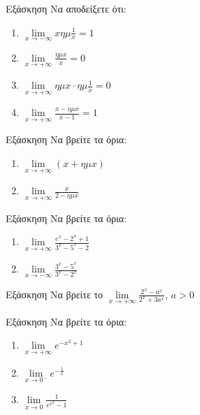 \documentclass[greek]{beamer}
\begin{document}
\begin{frame}{Εξάσκηση}
      Να αποδείξετε ότι:
      \begin{enumerate}
            \item $\lim\limits_{x \to -\infty}{ xημ\frac{1}{x} }=1$ \pause
            \item $\lim\limits_{x \to +\infty}{ \frac{ημx}{x}  }=0$  \pause
            \item $\lim\limits_{x \to +\infty}{ ημx\cdot ημ\frac{1}{x}  }=0$  \pause
            \item $\lim\limits_{x \to +\infty}{ \frac{x-ημx}{x-1}  }=1$
      \end{enumerate}
\end{frame}

\begin{frame}{Εξάσκηση}
      Να βρείτε τα όρια:
      \begin{enumerate}
            \item $\lim\limits_{x \to +\infty}{ (x+ημx) }$ \pause
            \item $\lim\limits_{x \to +\infty}{ \frac{x}{2-ημx}  }$
      \end{enumerate}
\end{frame}

\begin{frame}{Εξάσκηση}
      Να βρείτε τα όρια:
      \begin{enumerate}
            \item $\lim\limits_{x \to +\infty}{ \frac{e^x-2^x+1}{3^x-5^x-2} }$ \pause
            \item $\lim\limits_{x \to -\infty}{ \frac{3^x-5^x}{3^x-2^x}  }$
      \end{enumerate}
\end{frame}

\begin{frame}{Εξάσκηση}
      Να βρείτε το $\lim\limits_{x \to +\infty}{ \frac{2^x-a^x}{2^x+3a^x}  }$, $a>0$
\end{frame}

\begin{frame}{Εξάσκηση}
      Να βρείτε τα όρια:
      \begin{enumerate}
            \item $\lim\limits_{x \to +\infty}{ e^{-x^2+1} }$ \pause
            \item $\lim\limits_{x \to 0^-}{ e^{-\frac{1}{x}} }$\pause
            \item $\lim\limits_{x \to 0}{ \frac{1}{e^{x^2}-1}}$
      \end{enumerate}
\end{frame}
\end{document}
